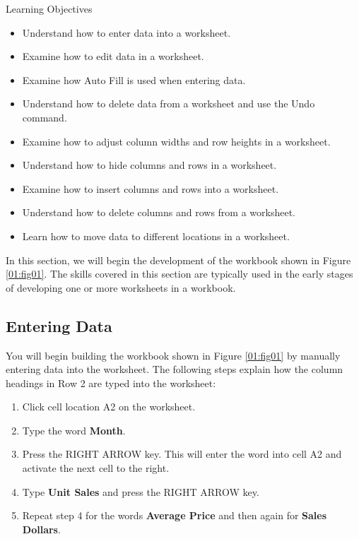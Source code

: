\begin{center}
	\begin{objbox}{Learning Objectives}
		\begin{itemize}
			\setlength{\itemsep}{0pt}
			\setlength{\parskip}{0pt}
			\setlength{\parsep}{0pt}
			
			\item Understand how to enter data into a worksheet.
			\item Examine how to edit data in a worksheet.
			\item Examine how Auto Fill is used when entering data.
			\item Understand how to delete data from a worksheet and use the Undo command.
			\item Examine how to adjust column widths and row heights in a worksheet.
			\item Understand how to hide columns and rows in a worksheet.
			\item Examine how to insert columns and rows into a worksheet.
			\item Understand how to delete columns and rows from a worksheet.
			\item Learn how to move data to different locations in a worksheet.

		\end{itemize}
	\end{objbox}
\end{center}

In this section, we will begin the development of the workbook shown in Figure \ref{01:fig01}. The skills covered in this section are typically used in the early stages of developing one or more worksheets in a workbook.

\subsection{Entering Data}

You will begin building the workbook shown in Figure \ref{01:fig01} by manually entering data into the worksheet. The following steps explain how the column headings in Row 2 are typed into the worksheet:

\begin{enumerate}
	\item Click cell location \textsf{A2} on the worksheet.
	\item Type the word \textbf{Month}.
	\item Press the RIGHT ARROW key. This will enter the word into cell \textsf{A2} and activate the next cell to the right.
	\item Type \textbf{Unit Sales} and press the RIGHT ARROW key.
	\item Repeat step 4 for the words \textbf{Average Price} and then again for \textbf{Sales Dollars}.
\end{enumerate}

